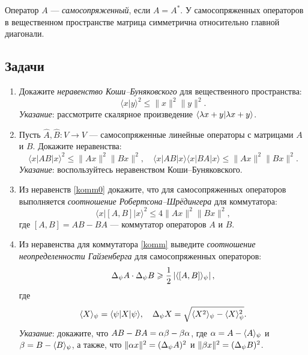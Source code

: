 Оператор $A$ --- \textit{самосопряженный}, если $A=A^*$. У самосопряженных операторов в вещественном пространстве матрица симметрична относительно главной диагонали.







\subsection*{Задачи}

\begin{enumerate}
\item Докажите \textit{неравенство Коши--Буняковского} для вещественного пространства:
$$
\langle x|y\rangle^2 \le \|x\|^2\|y\|^2.
$$
\textit{Указание}: рассмотрите скалярное произведение $\langle \lambda x+y|\lambda x+y\rangle$.

\item Пусть $\hat A,\hat B:V\to V$ --- самосопряженные линейные операторы с матрицами $A$ и $B$. Докажите неравенства:
\begin{equation}\label{komm0}
\langle x|AB|x\rangle^2 \le \|Ax\|^2\|Bx\|^2,\quad
\langle x|AB|x\rangle\langle x|BA|x\rangle \le \|Ax\|^2\|Bx\|^2.
\end{equation}
\textit{Указание}: воспользуйтесь неравенством Коши--Буняковского.

\item Из неравенств \eqref{komm0} докажите, что для самосопряженных операторов выполняется \textit{соотношение Робертсона--Шрёдингера} для коммутатора:
\begin{equation}\label{komm}
\langle x|[A,B]|x\rangle^2 \le 4\|Ax\|^2\|Bx\|^2,
\end{equation}
где $[A,B]=AB-BA$ --- коммутатор операторов $A$ и $B$.

\item Из неравенства для коммутатора \eqref{komm} выведите \textit{соотношение неопределенности Гайзенберга} для самосопряженных операторов:
$$
\Delta_\psi A\cdot\Delta_\psi B \geqslant \frac12 \left|\langle [A,B]\rangle_\psi\right|,
$$
где
$$
\langle X\rangle_\psi = \langle \psi|X|\psi\rangle,\quad
\Delta_\psi X = \sqrt{\langle X^2\rangle_\psi - \langle X\rangle_\psi^2}.
$$
\textit{Указание}: докажите, что $AB-BA=\alpha\beta-\beta\alpha$, где $\alpha=A-\langle A\rangle_\psi$ и $\beta=B-\langle B\rangle_\psi$, а также, что $\|\alpha x\|^2=(\Delta_\psi A)^2$ и $\|\beta x\|^2=(\Delta_\psi B)^2$.


\end{enumerate}




